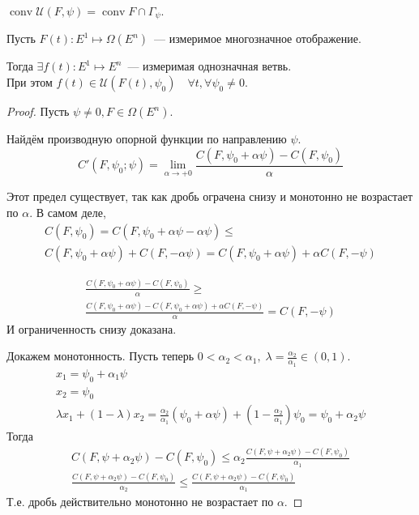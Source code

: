 \begin{lem}
    $\operatorname{conv} \mathcal{U}(F, \psi) = \operatorname{conv} F \cap \Gamma_\psi$.
\end{lem}

\begin{namedthm}
    Пусть $F(t)\colon E^1 \mapsto \Omega(E^n)$~--- измеримое многозначное отображение.

    Тогда $\exists f(t)\colon E^1 \mapsto E^n$~--- измеримая однозначная ветвь. \\
    При этом $f(t) \in \mathcal{U}(F(t), \psi_0) \quad \forall t, \forall \psi_0 \neq 0$.
\end{namedthm}
\begin{proof}
    Пусть $\psi \neq 0, F \in \Omega(E^n)$.
    
    Найдём производную опорной функции по направлению $\psi$.
    \begin{equation*}
        C'(F, \psi_0; \psi) = \lim\limits_{\alpha \to +0} \frac{C(F, \psi_0 + \alpha \psi) - C(F, \psi_0)}{\alpha}
    \end{equation*}

    Этот предел существует, так как дробь ограчена снизу и монотонно не возрастает по $\alpha$.
    В самом деле,
    \begin{multline*}
        C(F, \psi_0) = C(F, \psi_0 + \alpha \psi - \alpha \psi) \leqslant \\
        C(F, \psi_0 + \alpha \psi) + C(F, -\alpha \psi) =
        C(F, \psi_0 + \alpha \psi) + \alpha C(F, -\psi)
    \end{multline*}

    \begin{multline*}
        \frac{C(F, \psi_0 + \alpha \psi) - C(F, \psi_0)}{\alpha} \geqslant \\
        \frac{C(F, \psi_0 + \alpha \psi) - C(F, \psi_0 + \alpha \psi) + \alpha C(F, -\psi)}{\alpha} = C(F, -\psi)
    \end{multline*}
    И ограниченность снизу доказана.

    Докажем монотонность. 
    Пусть теперь $0 < \alpha_2 < \alpha_1, \; \lambda = \frac{\alpha_2}{\alpha_1} \in (0, 1)$.
    \begin{gather*}
        x_1 = \psi_0 + \alpha_1 \psi \\
        x_2 = \psi_0 \\
        \lambda x_1 + (1 - \lambda) x_2 = 
        \frac{\alpha_2}{\alpha_1} (\psi_0 + \alpha \psi) + \left(1 - \frac{\alpha_2}{\alpha_1}\right)\psi_0 =
        \psi_0 + \alpha_2 \psi
    \end{gather*}
    Тогда
    \begin{gather*}
        C(F, \psi + \alpha_2 \psi) - C(F, \psi_0) \leqslant \alpha_2 \frac{C(F, \psi + \alpha_2 \psi) - C(F, \psi_0)}{\alpha_1} \\
        \frac{C(F, \psi + \alpha_2 \psi) - C(F, \psi_0)}{\alpha_2} \leqslant \frac{C(F, \psi + \alpha_2 \psi) - C(F, \psi_0)}{\alpha_1}
   \end{gather*}
   Т.е. дробь действительно монотонно не возрастает по $\alpha$.
    

\end{proof}
